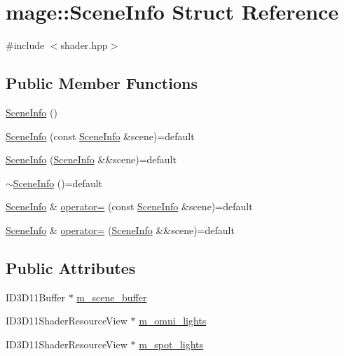 \hypertarget{structmage_1_1_scene_info}{}\section{mage\+:\+:Scene\+Info Struct Reference}
\label{structmage_1_1_scene_info}


{\ttfamily \#include $<$shader.\+hpp$>$}

\subsection*{Public Member Functions}
\begin{DoxyCompactItemize}
\item 
\hyperlink{structmage_1_1_scene_info_a8e5b36e32f72ab71aca27f213604e232}{Scene\+Info} ()
\item 
\hyperlink{structmage_1_1_scene_info_a8865f17176d3ec4592348bfa9ea40b66}{Scene\+Info} (const \hyperlink{structmage_1_1_scene_info}{Scene\+Info} \&scene)=default
\item 
\hyperlink{structmage_1_1_scene_info_a65fcf70d034db7f6d1153971a39af6f8}{Scene\+Info} (\hyperlink{structmage_1_1_scene_info}{Scene\+Info} \&\&scene)=default
\item 
\hyperlink{structmage_1_1_scene_info_ae35c1c6c36aa0bfa8794f2aeb5e10636}{$\sim$\+Scene\+Info} ()=default
\item 
\hyperlink{structmage_1_1_scene_info}{Scene\+Info} \& \hyperlink{structmage_1_1_scene_info_a785e7ad1ec491dbb657d2f2d11ed77bc}{operator=} (const \hyperlink{structmage_1_1_scene_info}{Scene\+Info} \&scene)=default
\item 
\hyperlink{structmage_1_1_scene_info}{Scene\+Info} \& \hyperlink{structmage_1_1_scene_info_a61dea73dc9c2f3ca7fdfe70f9bee33ac}{operator=} (\hyperlink{structmage_1_1_scene_info}{Scene\+Info} \&\&scene)=default
\end{DoxyCompactItemize}
\subsection*{Public Attributes}
\begin{DoxyCompactItemize}
\item 
I\+D3\+D11\+Buffer $\ast$ \hyperlink{structmage_1_1_scene_info_a9f2dda2382ece506438684848c019447}{m\+\_\+scene\+\_\+buffer}
\item 
I\+D3\+D11\+Shader\+Resource\+View $\ast$ \hyperlink{structmage_1_1_scene_info_adff390c6f7b8aee3cee4d799cfe10ea7}{m\+\_\+omni\+\_\+lights}
\item 
I\+D3\+D11\+Shader\+Resource\+View $\ast$ \hyperlink{structmage_1_1_scene_info_a531d21ed313faf3c786501d04dd62289}{m\+\_\+spot\+\_\+lights}
\end{DoxyCompactItemize}


